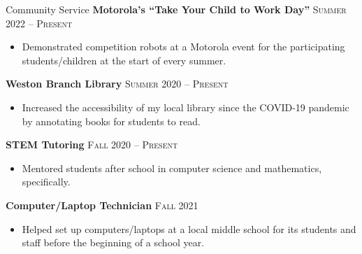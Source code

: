 \begin{resume_section}{Community Service}
	\textbf{Motorola’s “Take Your Child to Work Day”} \hspace*{\fill} \textsc{Summer 2022 -- Present}

	\begin{itemize}
		\setlength{\labelsep}{0.1in}
		\item Demonstrated competition robots at a Motorola event for the participating students/children at the start of every summer.
	\end{itemize}

	\textbf{Weston Branch Library} \hspace*{\fill} \textsc{Summer 2020 -- Present}

	\begin{itemize}
		\setlength{\labelsep}{0.1in}
		\item Increased the accessibility of my local library since the COVID-19 pandemic by annotating books for students to read.
	\end{itemize}

	\textbf{STEM Tutoring} \hspace*{\fill} \textsc{Fall 2020 -- Present}

	\begin{itemize}
		\setlength{\labelsep}{0.1in}
		\item Mentored students after school in computer science and mathematics, specifically.
	\end{itemize}

	\textbf{Computer/Laptop Technician} \hspace*{\fill} \textsc{Fall 2021}

	\begin{itemize}
		\setlength{\labelsep}{0.1in}
		\item Helped set up computers/laptops at a local middle school for its students and staff before the beginning of a school year.
	\end{itemize}
\end{resume_section}

\medskip

